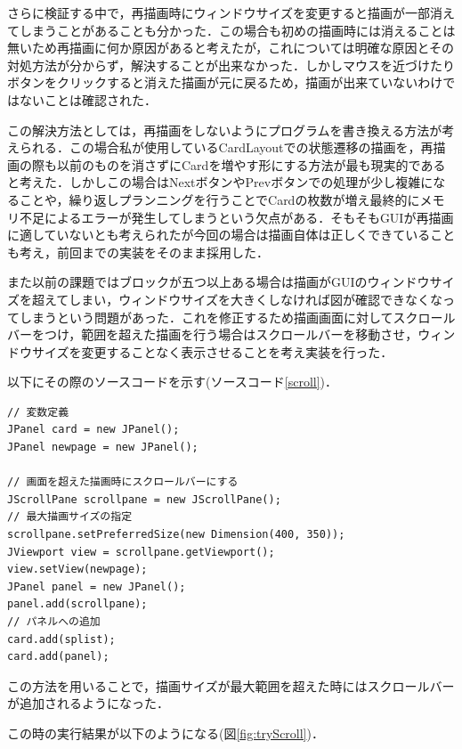 \documentclass[12pt]{jarticle}
\begin{document}
さらに検証する中で，再描画時にウィンドウサイズを変更すると描画が一部消えてしまうことがあることも分かった．この場合も初めの描画時には消えることは無いため再描画に何か原因があると考えたが，これについては明確な原因とその対処方法が分からず，解決することが出来なかった．しかしマウスを近づけたりボタンをクリックすると消えた描画が元に戻るため，描画が出来ていないわけではないことは確認された．\par
この解決方法としては，再描画をしないようにプログラムを書き換える方法が考えられる．この場合私が使用しているCardLayoutでの状態遷移の描画を，再描画の際も以前のものを消さずにCardを増やす形にする方法が最も現実的であると考えた．しかしこの場合はNextボタンやPrevボタンでの処理が少し複雑になることや，繰り返しプランニングを行うことでCardの枚数が増え最終的にメモリ不足によるエラーが発生してしまうという欠点がある．そもそもGUIが再描画に適していないとも考えられたが今回の場合は描画自体は正しくできていることも考え，前回までの実装をそのまま採用した．\\

\clearpage

また以前の課題ではブロックが五つ以上ある場合は描画がGUIのウィンドウサイズを超えてしまい，ウィンドウサイズを大きくしなければ図が確認できなくなってしまうという問題があった．これを修正するため描画画面に対してスクロールバーをつけ，範囲を超えた描画を行う場合はスクロールバーを移動させ，ウィンドウサイズを変更することなく表示させることを考え実装を行った．\\

\vspace{10mm}

以下にその際のソースコードを示す(ソースコード\ref{scroll})．
\begin{lstlisting}[caption=スクロールバーの追加,label=scroll]
// 変数定義
JPanel card = new JPanel();
JPanel newpage = new JPanel();

// 画面を超えた描画時にスクロールバーにする
JScrollPane scrollpane = new JScrollPane();
// 最大描画サイズの指定
scrollpane.setPreferredSize(new Dimension(400, 350));
JViewport view = scrollpane.getViewport();
view.setView(newpage);
JPanel panel = new JPanel();
panel.add(scrollpane);
// パネルへの追加
card.add(splist);
card.add(panel);
\end{lstlisting}

この方法を用いることで，描画サイズが最大範囲を超えた時にはスクロールバーが追加されるようになった．

\clearpage

この時の実行結果が以下のようになる(図\ref{fig:tryScroll})．\\
\end{document}
